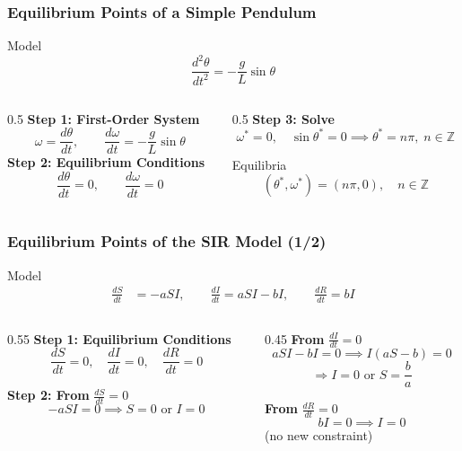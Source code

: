 \documentclass{beamer}
\begin{document}
\begin{frame}
\frametitle{Equilibrium Points of a Simple Pendulum}
\small
\begin{block}{Model}
\[
\frac{d^2\theta}{dt^2} = -\frac{g}{L}\sin\theta
\]
\end{block}

\begin{columns}[T,totalwidth=\textwidth]
\begin{column}{0.5\textwidth}
\textbf{Step 1: First-Order System}
\[
\omega = \frac{d\theta}{dt}, \qquad 
\frac{d\omega}{dt} = -\frac{g}{L}\sin\theta
\]
\vspace{1em}
\textbf{Step 2: Equilibrium Conditions}
\[
\frac{d\theta}{dt} = 0, \qquad 
\frac{d\omega}{dt} = 0
\]
\end{column}
\begin{column}{0.5\textwidth}
\textbf{Step 3: Solve}
\[
\omega^* = 0, \quad \sin\theta^* = 0 
\implies \theta^* = n\pi, \; n \in \mathbb{Z}
\]
\begin{block}{Equilibria}
\[
(\theta^*, \omega^*) = (n\pi, 0), \quad n \in \mathbb{Z}
\]
\end{block}
\end{column}
\end{columns}
\end{frame}


\begin{frame}
\frametitle{Equilibrium Points of the SIR Model (1/2)}
\small
\begin{block}{Model}
\[
\begin{aligned}
\frac{dS}{dt} &= -aSI, \qquad
\frac{dI}{dt} = aSI - bI, \qquad
\frac{dR}{dt} = bI
\end{aligned}
\]
\end{block}

\begin{columns}[T,totalwidth=\textwidth]
\begin{column}{0.55\textwidth}
\textbf{Step 1: Equilibrium Conditions}
\[
\frac{dS}{dt} = 0, \quad 
\frac{dI}{dt} = 0, \quad 
\frac{dR}{dt} = 0
\]

\textbf{Step 2: From } $\frac{dS}{dt}=0$
\[
-aSI = 0 \implies S=0 \text{ or } I=0
\]
\end{column}

\begin{column}{0.45\textwidth}
\textbf{From } $\frac{dI}{dt}=0$
\[
aSI - bI = 0 \implies I(aS-b)=0
\]
\[
\Rightarrow I=0 \text{ or } S = \frac{b}{a}
\]

\textbf{From } $\frac{dR}{dt}=0$
\[
bI = 0 \implies I=0
\]
(no new constraint)
\end{column}
\end{columns}
\end{frame}
\end{document}
